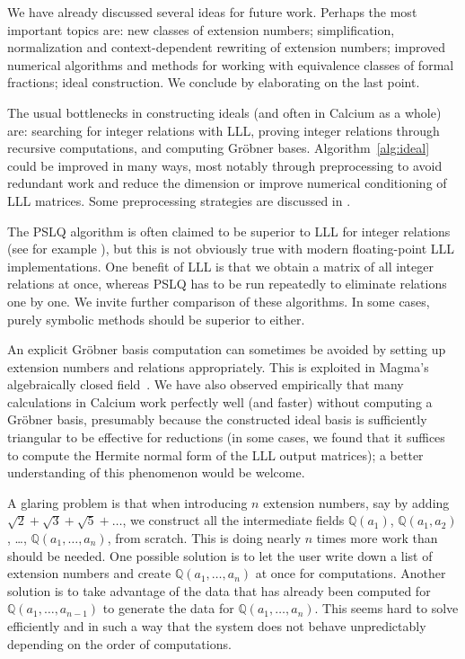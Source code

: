 \documentclass[11pt,a4paper]{article}
\begin{document}
We have already discussed several ideas for future work.
Perhaps the most important topics are: new classes
of extension numbers;
simplification, normalization and context-dependent
rewriting of extension numbers; improved numerical algorithms
and methods for working with equivalence classes
of formal fractions; ideal construction.
We conclude by elaborating on the last point.

The usual bottlenecks in constructing ideals (and often in Calcium
as a whole) are: searching for integer relations with LLL,
proving integer relations through recursive computations,
and computing Gr\"{o}bner bases.
Algorithm~\ref{alg:ideal} could be improved in many ways,
most notably through preprocessing
to avoid redundant work and
reduce the dimension or improve numerical
conditioning of LLL matrices.
Some preprocessing strategies are discussed in \cite{BBK2014}.

The PSLQ algorithm is often claimed to be superior to LLL for
integer relations (see for example \cite{BBK2014}),
but this is not obviously true
with modern floating-point LLL implementations.
One benefit of LLL is that we obtain
a matrix of all integer relations at once,
whereas PSLQ has to be run repeatedly to eliminate relations
one by one. We invite further comparison of these algorithms.
In some cases, purely symbolic methods
should be superior to either.

An explicit Gr\"{o}bner basis computation can sometimes be avoided
by setting up extension numbers and relations appropriately.
This is exploited in Magma's algebraically closed field~\cite{Ste2010}.
We have also observed empirically that many calculations in Calcium
work perfectly well (and faster) without computing a Gr\"{o}bner basis,
presumably because the constructed ideal basis is sufficiently triangular
to be effective for reductions (in some cases, we found that
it suffices to compute the Hermite normal form of the LLL output matrices);
a better understanding of this phenomenon would be welcome.

A glaring problem is that when introducing
$n$ extension numbers,
say by adding $\sqrt{2} + \sqrt{3} + \sqrt{5} + \ldots$,
we construct all the intermediate
fields $\mathbb{Q}(a_1)$, $\mathbb{Q}(a_1,a_2)$, \ldots, $\mathbb{Q}(a_1,\ldots,a_n)$,
from scratch.
This is doing nearly $n$ times more work than should be needed.
One possible solution is to let
the user write down a list of extension numbers
and create $\mathbb{Q}(a_1,\ldots,a_n)$ at once for computations.
Another solution is to take advantage of the data that has
already been computed for
$\mathbb{Q}(a_1,\ldots,a_{n-1})$
to generate the data for $\mathbb{Q}(a_1,\ldots,a_n)$.
This seems hard to solve efficiently
and in such a way that the system does not behave
unpredictably depending on the
order of computations.



\end{document}
